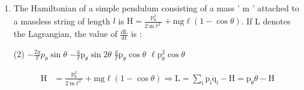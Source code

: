 \begin{enumerate}
\begin{answer}
\begin{align}
&\dot{r}=\frac{\partial H}{\partial p_{r}}=\frac{p_{r}}{m} \label{HM-30}\\
&\dot{p}_{\theta}=-\frac{\partial H}{\partial \theta}=0 \label{HM-31}\\
&\dot{\theta}=\frac{\partial H}{\partial p_{\theta}}=\frac{p_{\theta}}{m r^{2}}\label{HM-32}
\intertext{Equations (\ref{HM-29}), (\ref{HM-30}), (\ref{HM-31}) and (\ref{HM-32}) are the required Hamilton's equations. However they can be combined to reduce the number of equations describing the motion. Equations (\ref{HM-29}) and (\ref{HM-30}) combine into (after elimination of $\dot{p}_{r}$ )}\notag
\ddot{r}&=\frac{p_{\theta}^{2}}{m^{2} r^{3}}-\frac{1}{m} \frac{\partial V}{\partial r}=\frac{m^{2} r^{4} \dot{\theta}^{2}}{m^{2} r^{2}}-\frac{1}{m} \frac{\partial V}{\partial r}\notag
\intertext{and (\ref{HM-31}) and (\ref{HM-32}) combine into (after elimination of $\dot{p}_{\theta}$ ) $\ddot{\theta}=0$ Thus the equations describing motion of the particle are}
\ddot{r}-r \dot{\theta}^{2}&=-\frac{1}{m} \frac{\partial V}{\partial r} \text { and } \ddot{\theta}=0\notag\\
\text{Or, }\quad \ddot{r}-r \dot{\theta}^{2}&=-\frac{1}{m} \frac{\partial V}{\partial r}\text{ and }\dot{\theta}=\frac{p_{\theta}}{m r^{2}}=\frac{a \text { constant }}{m r^{2}}\notag\\
\quad\left(\because p_{\theta}=a\right.&\text{ constant from }\left.(i i i)\right)\text{
	Or, }\quad m r^{2} \dot{\theta}=a\text{ constant}\notag
	\end{align}
	\end{answer}
	\item The Hamiltonian of a simple pendulum consisting of a mass ' $\mathrm{m}$ ' attached to a massless string of length $l$ is $\mathrm{H}=\frac{\mathrm{p}_{\theta}^{2}}{2 \mathrm{~m} \ell^{2}}+\mathrm{mg} \ell(1-\cos \theta)$. If L denotes the Lagrangian, the value of $\frac{\mathrm{dL}}{\mathrm{dt}}$ is :
	 \begin{tasks}(2)
		\task[\textbf{a.}]$-\frac{2 g}{\ell} p_{\theta} \sin \theta$
		\task[\textbf{b.}]$-\frac{\mathrm{g}}{\ell} \mathrm{p}_{\theta} \sin 2 \theta$
		\task[\textbf{c.}] $\frac{\mathrm{g}}{\ell} \mathrm{p}_{\theta} \cos \theta$
		\task[\textbf{d.}] $\ell \mathrm{p}_{\theta}^{2} \cos \theta$
	\end{tasks}
	\begin{answer}
		\begin{align*}
		\mathrm{H}&=\frac{\mathrm{p}_{\theta}^{2}}{2 \mathrm{~m} \ell^{2}}+\mathrm{mg} \ell(1-\cos \theta) \Rightarrow \mathrm{L}=\sum_{\mathrm{i}} \mathrm{p}_{\mathrm{i}} \dot{\mathrm{q}}_{\mathrm{i}}-\mathrm{H}=\mathrm{p}_{\theta} \dot{\theta}-\mathrm{H}\\

\end{align*}
\end{answer}
\end{enumerate}
